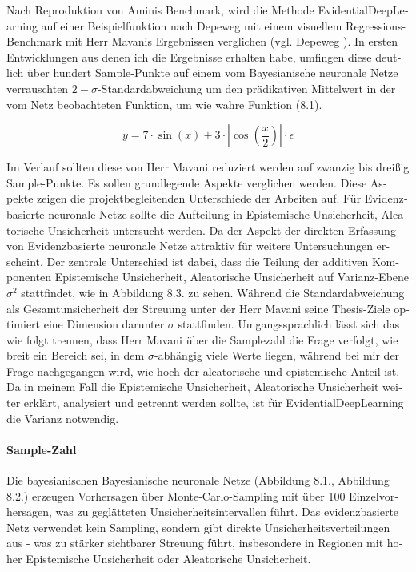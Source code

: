 \begin{otherlanguage}{ngerman}
Nach Reproduktion von Aminis Benchmark, wird die Methode \gls{EvidentialDeepLearning} auf einer Beispielfunktion nach Depeweg mit einem visuellem Regressions-Benchmark mit Herr Mavanis Ergebnissen verglichen (vgl. Depeweg \parencite[S.56, (4.1)]{Depeweg2019}). In ersten Entwicklungen aus denen ich die Ergebnisse erhalten habe, umfingen diese deutlich über hundert Sample-Punkte auf einem vom \gls{Bayesianische neuronale Netze} verrauschten $2-\sigma$-Standardabweichung um den prädikativen Mittelwert in der vom Netz beobachteten Funktion, um wie wahre Funktion (8.1).

\begin{equation}
y = 7 \cdot \sin(x) + 3 \cdot \left| \cos\left( \frac{x}{2} \right) \right| \cdot \epsilon
\end{equation}

Im Verlauf sollten diese von Herr Mavani reduziert werden auf zwanzig bis dreißig Sample-Punkte. Es sollen grundlegende Aspekte verglichen werden. Diese Aspekte zeigen die projektbegleitenden Unterschiede der Arbeiten auf. Für \gls{Evidenzbasierte neuronale Netze} sollte die Aufteilung in \gls{Epistemische Unsicherheit}, \gls{Aleatorische Unsicherheit} untersucht werden. Da der Aspekt der direkten Erfassung von \gls{Evidenzbasierte neuronale Netze} attraktiv für weitere Untersuchungen erscheint. Der zentrale Unterschied ist dabei, dass die Teilung der additiven Komponenten \gls{Epistemische Unsicherheit}, \gls{Aleatorische Unsicherheit} auf Varianz-Ebene $\sigma^{2}$ stattfindet, wie in Abbildung 8.3. zu sehen. Während die Standardabweichung als Gesamtunsicherheit der Streuung unter der Herr Mavani seine Thesis-Ziele optimiert eine Dimension darunter $\sigma$ stattfinden. Umgangssprachlich lässt sich das wie folgt trennen, dass Herr Mavani über die Samplezahl die Frage verfolgt, wie breit ein Bereich sei, in dem $\sigma$-abhängig viele Werte liegen, während bei mir der Frage nachgegangen wird, wie hoch der aleatorische und epistemische Anteil ist. Da in meinem Fall die \gls{Epistemische Unsicherheit}, \gls{Aleatorische Unsicherheit} weiter erklärt, analysiert und getrennt werden sollte, ist für \gls{EvidentialDeepLearning} die Varianz notwendig.

\paragraph{Sample-Zahl} Die \gls{bayesianischen Bayesianische neuronale Netze} (Abbildung 8.1., Abbildung 8.2.) erzeugen Vorhersagen über Monte-Carlo-Sampling mit über 100 Einzelvorhersagen, was zu geglätteten Unsicherheitsintervallen führt. Das evidenzbasierte Netz verwendet kein Sampling, sondern gibt direkte Unsicherheitsverteilungen aus - was zu stärker sichtbarer Streuung führt, insbesondere in Regionen mit hoher \gls{Epistemische Unsicherheit} oder \gls{Aleatorische Unsicherheit}.


\end{otherlanguage}
